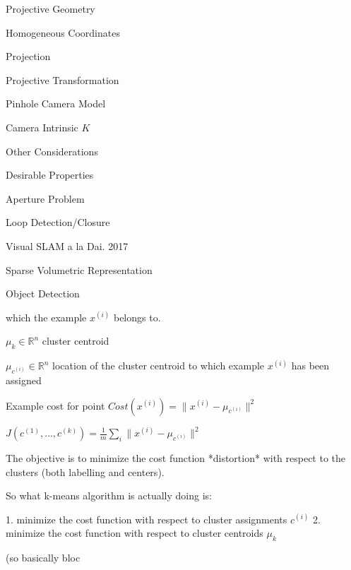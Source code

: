 \begin{section}
\begin{subsubsection}
\begin{subsubsection}
\begin{subsubsection}
\begin{section}{Projective Geometry}
\begin{subsection}{Homogeneous Coordinates}
\begin{subsubsection}
{\begin{subsubsection}{Projection}
\begin{subsubsection}{Projective Transformation}
\begin{subsection}
\begin{subsubsection}
\begin{subsubsection}
\begin{subsubsection}
{\begin{subsubsection}
\begin{subsection}
\begin{subsection} {Pinhole Camera Model}
\begin{subsection} {Camera Intrinsic $K$}
\begin{subsection}
\begin{subsection}
\begin{subsubsection}{Other Considerations}
{\begin{subsection}
\begin{subsubsection}{Desirable Properties}
\begin{section}
\begin{subsection}
\begin{subsection}
\begin{subsection}
\begin{section}
\begin{subsection}
\begin{subsubsection}
\begin{subsubsection}
\begin{subsection}
\begin{section}
\begin{subsection}
\begin{subsubsection}{Aperture Problem}
\begin{subsubsection}
{\begin{section}
\begin{subsubsection}
\begin{subsubsection}
\begin{subsubsection}
\begin{subsection}
\begin{subsection}
\begin{subsection}
\begin{subsection}
\begin{subsection}
\begin{subsection}
\begin{subsection}
\begin{subsubsection}
{\begin{subsubsection}
{\begin{subsubsection}
\begin{section}
\begin{section}
\begin{section}
\begin{subsubsection}
\begin{subsubsection}{Loop Detection/Closure}
\begin{subsubsection}{Visual SLAM a la Dai. 2017}
\begin{subsubsection}{Sparse Volumetric Representation}
\begin{subsection}
\begin{section}{Object Detection}
\begin{subsubsection}
{\begin{subsection}
\begin{subsection}
\begin{section}
\begin{section}
\begin{subsection}
\begin{subsubsection}
\begin{subsubsection}
\begin{subsection}
\begin{subsection}
\begin{subsubsection}
\begin{subsubsection}
\begin{subsubsection}
{\begin{subsection}
\begin{subsection}
\begin{subsection}
\begin{subsection}
\begin{section}
\begin{subsection}
\begin{subsubsection}
\begin{subsubsection}
\begin{subsubsection}
\begin{subsubsection}
\begin{subsubsection}
\begin{subsubsection}
\begin{subsection}
\begin{subsubsection}
\begin{subsection}
\begin{subsection}
\begin{subsubsection}
\begin{subsubsection}
\begin{subsection}
\begin{subsubsection}
{{\begin{section}
\begin{section}
\begin{subsection}
{{{\begin{subsubsection}
\begin{subsubsection}
\begin{subsection}
{\begin{section}
\begin{section}
\begin{section}
\begin{section}
\begin{subsection}
{\begin{section}
\begin{subsection}
\begin{subsubsection}
{\begin{subsubsection}
{which the example $x^{(i)}$ belongs to.

$\mu_k \in \mathbb R ^n $ cluster centroid 

$\mu_{c^{(i)}} \in \mathbb R ^n $ location of the cluster centroid to which example $x^{(i)}$ has been assigned

Example cost for point $Cost(x^{(i)}) = \|x^{(i)} - \mu_{c^{(i)}} \|^2$ 

$J(c^{(1)},\dots, c^{(k)})= \frac{1}{m}\sum_i \|x^{(i)} - \mu_{c^{(i)}} \|^2 $

The objective is to minimize the cost function *distortion* with respect to the clusters (both labelling and centers).

So what k-means algorithm is actually doing is:

1. minimize the cost function with respect to cluster assignments $c^{(i)}$
2. minimize the cost function with respect to cluster centroids $\mu_k$ 

(so basically bloc}
\end{subsubsection}}
\end{subsubsection}
\end{subsection}
\end{section}}
\end{subsection}
\end{section}
\end{section}
\end{section}
\end{section}}
\end{subsection}
\end{subsubsection}
\end{subsubsection}}}}
\end{subsection}
\end{section}
\end{section}}}
\end{subsubsection}
\end{subsection}
\end{subsubsection}
\end{subsubsection}
\end{subsection}
\end{subsection}
\end{subsubsection}
\end{subsection}
\end{subsubsection}
\end{subsubsection}
\end{subsubsection}
\end{subsubsection}
\end{subsubsection}
\end{subsubsection}
\end{subsection}
\end{section}
\end{subsection}
\end{subsection}
\end{subsection}
\end{subsection}}
\end{subsubsection}
\end{subsubsection}
\end{subsubsection}
\end{subsection}
\end{subsection}
\end{subsubsection}
\end{subsubsection}
\end{subsection}
\end{section}
\end{section}
\end{subsection}
\end{subsection}}
\end{subsubsection}
\end{section}
\end{subsection}
\end{subsubsection}
\end{subsubsection}
\end{subsubsection}
\end{subsubsection}
\end{section}
\end{section}
\end{section}
\end{subsubsection}}
\end{subsubsection}}
\end{subsubsection}
\end{subsection}
\end{subsection}
\end{subsection}
\end{subsection}
\end{subsection}
\end{subsection}
\end{subsection}
\end{subsubsection}
\end{subsubsection}
\end{subsubsection}
\end{section}}
\end{subsubsection}
\end{subsubsection}
\end{subsection}
\end{section}
\end{subsection}
\end{subsubsection}
\end{subsubsection}
\end{subsection}
\end{section}
\end{subsection}
\end{subsection}
\end{subsection}
\end{section}
\end{subsubsection}
\end{subsection}}
\end{subsubsection}
\end{subsection}
\end{subsection}
\end{subsection}
\end{subsection}
\end{subsection}
\end{subsubsection}}
\end{subsubsection}
\end{subsubsection}
\end{subsubsection}
\end{subsection}
\end{subsubsection}
\end{subsubsection}}
\end{subsubsection}
\end{subsection}
\end{section}
\end{subsubsection}
\end{subsubsection}
\end{subsubsection}
\end{section}

